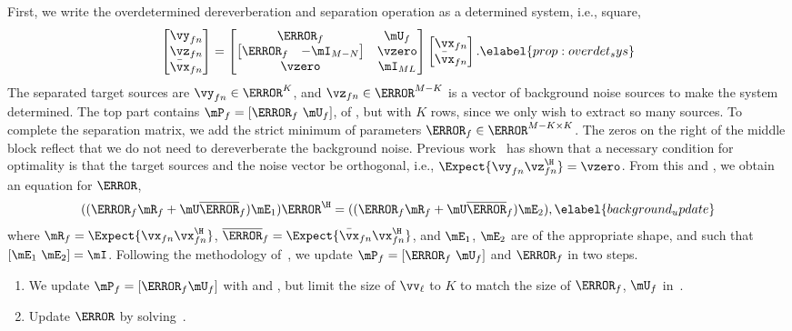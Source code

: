 \documentclass[a4paper]{article}
\begin{document}
First, we write the overdetermined dereverberation and separation operation as a determined system, i.e., square,
\begin{align}
  \begin{bmatrix}
    \vy_{fn} \\ \vz_{fn} \\ \bar{\vx}_{fn}
  \end{bmatrix}
  = \begin{bmatrix}
    \mW_f & \mU_f \\
    \begin{bmatrix} \mJ_f & -\mI_{M-N} \end{bmatrix} & \vzero \\
    \vzero & \mI_{M L}
  \end{bmatrix}
  \begin{bmatrix} \vx_{fn} \\ \bar{\vx}_{fn} \end{bmatrix}.
  \elabel{prop:overdet_sys}
\end{align}
The separated target sources are $\vy_{fn}\in\C^K$, and $\vz_{fn}\in\C^{M-K}$ is a vector of background noise sources to make the system determined.
The top part contains $\mP_f = [\mW_f\ \mU_f]$, of , but with $K$ rows, since we only wish to extract so many sources.
To complete the separation matrix, we add the strict minimum of parameters $\mJ_f\in \C^{M-K\times K}$.
The zeros on the right of the middle block reflect that we do not need to dereverberate the background noise.
Previous work~\cite{scheibler_mm_2020,ikeshitaOverdeterminedIndependentVector2020,togamiOverdeterminedSpeechSource2020a} has shown that a necessary condition for optimality is that the target sources and the noise vector be orthogonal, i.e., $\Expect{\vy_{fn} \vz_{fn}^\H} = \vzero$.
From this and , we obtain an equation for $\mJ$,
\begin{align}
  ((\mW_f \mR_f + \mU \overline{\mC}_f) \mE_1) \mJ^\H = ((\mW_f \mR_f + \mU \overline{\mC}_f) \mE_2),
  \elabel{background_update}
\end{align}
where $\mR_f = \Expect{\vx_{fn} \vx_{fn}^\H}$, $\overline{\mC}_f = \Expect{\bar{\vx}_{fn} \vx_{fn}^\H}$, and $\mE_1$, $\mE_2$ are of the appropriate shape, and such that $[\mE_1\ \mE_2] = \mI$.
%
Following the methodology of~\cite{duComputationallyEfficientOverdeterminedBlind2021}, we update $\mP_f = [\mW_f\ \mU_f]$ and $\mJ_f$ in two steps.
\begin{enumerate}
  \item We update $\mP_f = [\mW_f \mU_f]$ with  and , but limit the size of $\vv_\ell$ to $K$ to match the size of $\mW_f$, $\mU_f$ in~.
  \item Update $\mJ$ by solving~.
\end{enumerate}
\end{document}

